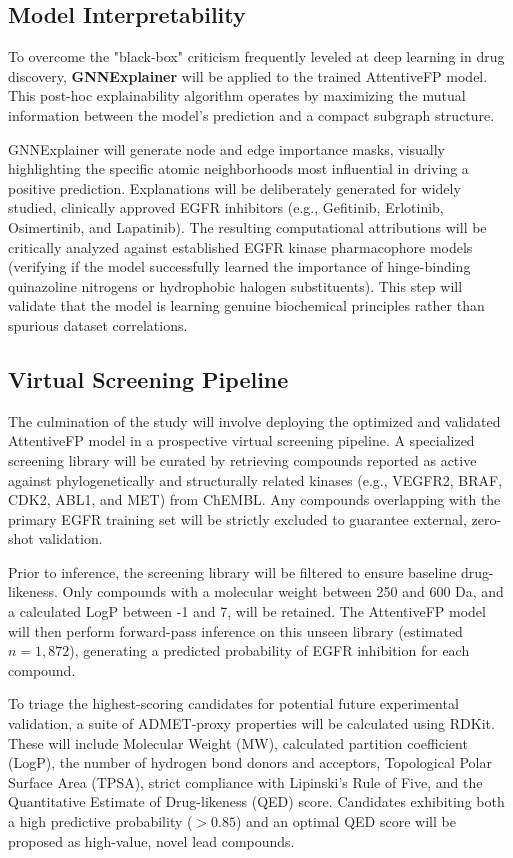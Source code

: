 \subsection{Model Interpretability}

To overcome the "black-box" criticism frequently leveled at deep learning in drug discovery, \textbf{GNNExplainer} will be applied to the trained AttentiveFP model. This post-hoc explainability algorithm operates by maximizing the mutual information between the model's prediction and a compact subgraph structure.

GNNExplainer will generate node and edge importance masks, visually highlighting the specific atomic neighborhoods most influential in driving a positive prediction. Explanations will be deliberately generated for widely studied, clinically approved EGFR inhibitors (e.g., Gefitinib, Erlotinib, Osimertinib, and Lapatinib). The resulting computational attributions will be critically analyzed against established EGFR kinase pharmacophore models (verifying if the model successfully learned the importance of hinge-binding quinazoline nitrogens or hydrophobic halogen substituents). This step will validate that the model is learning genuine biochemical principles rather than spurious dataset correlations.

\subsection{Virtual Screening Pipeline}

The culmination of the study will involve deploying the optimized and validated AttentiveFP model in a prospective virtual screening pipeline. A specialized screening library will be curated by retrieving compounds reported as active against phylogenetically and structurally related kinases (e.g., VEGFR2, BRAF, CDK2, ABL1, and MET) from ChEMBL. Any compounds overlapping with the primary EGFR training set will be strictly excluded to guarantee external, zero-shot validation.

Prior to inference, the screening library will be filtered to ensure baseline drug-likeness. Only compounds with a molecular weight between 250 and 600 Da, and a calculated LogP between -1 and 7, will be retained. The AttentiveFP model will then perform forward-pass inference on this unseen library (estimated $n=1,872$), generating a predicted probability of EGFR inhibition for each compound.

To triage the highest-scoring candidates for potential future experimental validation, a suite of ADMET-proxy properties will be calculated using RDKit. These will include Molecular Weight (MW), calculated partition coefficient (LogP), the number of hydrogen bond donors and acceptors, Topological Polar Surface Area (TPSA), strict compliance with Lipinski’s Rule of Five, and the Quantitative Estimate of Drug-likeness (QED) score. Candidates exhibiting both a high predictive probability ($>0.85$) and an optimal QED score will be proposed as high-value, novel lead compounds.

